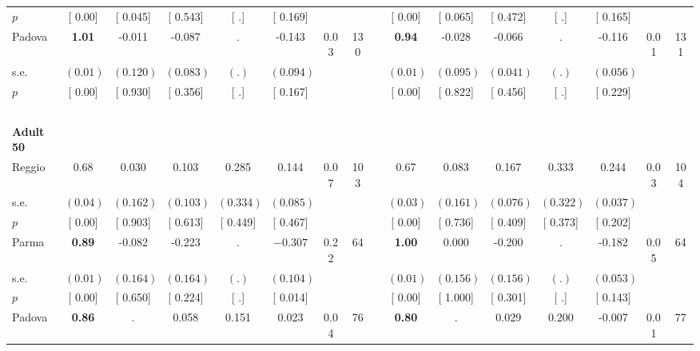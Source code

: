 \begin{longtable}{L{8em} c c c c c c c p{1em} c c c c c c c}
\quad \quad \quad \quad $ p$ & [     0.00] & [    0.045] & [    0.543] & [        .] & [    0.169] & & & & [     0.00] & [    0.065] & [    0.472] & [        .] & [    0.165] & &  \\[1em]
\quad \quad \quad Padova& \textbf{     1.01} &    -0.011 &    -0.087 &         . &    -0.143 &      0.03 &       130 & & \textbf{     0.94} &    -0.028 &    -0.066 &         . &    -0.116 &      0.01 &       131  \\*
\quad \quad \quad \quad s.e.& $ (     0.01)$ & $ (    0.120)$ & $ (    0.083)$ & $ (        .)$ & $ (    0.094)$ & & & & $ (     0.01)$ & $ (    0.095)$ & $ (    0.041)$ & $ (        .)$ & $ (    0.056)$ & &  \\*
\quad \quad \quad \quad $ p$ & [     0.00] & [    0.930] & [    0.356] & [        .] & [    0.167] & & & & [     0.00] & [    0.822] & [    0.456] & [        .] & [    0.229] & &  \\[1em]
~\\[1em]
\quad \quad \textbf{Adult 50} & & & & & & & & & & & & & & & \\* 
\quad \quad \quad Reggio& 0.68 &     0.030 &     0.103 &     0.285 &     0.144 &      0.07 &       103 & & 0.67 &     0.083 &     0.167 &     0.333 &     0.244 &      0.03 &       104  \\*
\quad \quad \quad \quad s.e.& $ (     0.04)$ & $ (    0.162)$ & $ (    0.103)$ & $ (    0.334)$ & $ (    0.085)$ & & & & $ (     0.03)$ & $ (    0.161)$ & $ (    0.076)$ & $ (    0.322)$ & $ (    0.037)$ & &  \\*
\quad \quad \quad \quad $ p$ & [     0.00] & [    0.903] & [    0.613] & [    0.449] & [    0.467] & & & & [     0.00] & [    0.736] & [    0.409] & [    0.373] & [    0.202] & &  \\[1em]
\quad \quad \quad Parma& \textbf{     0.89} &    -0.082 &    -0.223 &         . & $ \mathbf{   -0.307}$ &      0.22 &        64 & & \textbf{     1.00} &     0.000 &    -0.200 &         . &    -0.182 &      0.05 &        64  \\*
\quad \quad \quad \quad s.e.& $ (     0.01)$ & $ (    0.164)$ & $ (    0.164)$ & $ (        .)$ & $ (    0.104)$ & & & & $ (     0.01)$ & $ (    0.156)$ & $ (    0.156)$ & $ (        .)$ & $ (    0.053)$ & &  \\*
\quad \quad \quad \quad $ p$ & [     0.00] & [    0.650] & [    0.224] & [        .] & [    0.014] & & & & [     0.00] & [    1.000] & [    0.301] & [        .] & [    0.143] & &  \\[1em]
\quad \quad \quad Padova& \textbf{     0.86} &         . &     0.058 &     0.151 &     0.023 &      0.04 &        76 & & \textbf{     0.80} &         . &     0.029 &     0.200 &    -0.007 &      0.01 &        77  \\*

\end{longtable}
